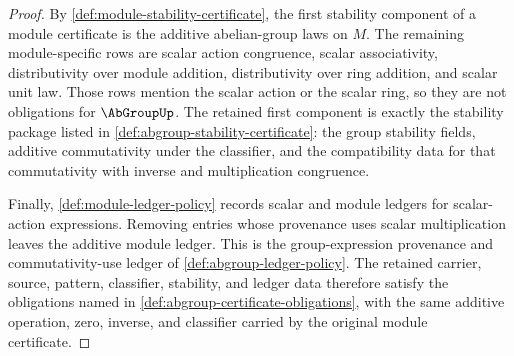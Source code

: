 \begin{proof}
By \autoref{def:module-stability-certificate}, the first stability component of a module certificate is the additive abelian-group laws on $M$. The remaining module-specific rows are scalar action congruence, scalar associativity, distributivity over module addition, distributivity over ring addition, and scalar unit law. Those rows mention the scalar action or the scalar ring, so they are not obligations for $\AbGroupUp$. The retained first component is exactly the stability package listed in \autoref{def:abgroup-stability-certificate}: the group stability fields, additive commutativity under the classifier, and the compatibility data for that commutativity with inverse and multiplication congruence.

Finally, \autoref{def:module-ledger-policy} records scalar and module ledgers for scalar-action expressions. Removing entries whose provenance uses scalar multiplication leaves the additive module ledger. This is the group-expression provenance and commutativity-use ledger of \autoref{def:abgroup-ledger-policy}. The retained carrier, source, pattern, classifier, stability, and ledger data therefore satisfy the obligations named in \autoref{def:abgroup-certificate-obligations}, with the same additive operation, zero, inverse, and classifier carried by the original module certificate.
\end{proof}

